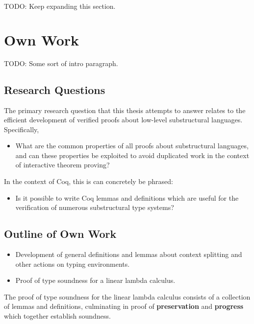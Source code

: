 \documentclass[]{unswthesis}
\begin{document}
TODO: Keep expanding this section.



\chapter{Own Work}

TODO: Some sort of intro paragraph.

\section{Research Questions}

The primary research question that this thesis attempts to answer relates to the efficient development of verified proofs about low-level substructural languages. Specifically,

\begin{itemize}
\item What are the common properties of all proofs about substructural languages, and can these properties be exploited to avoid duplicated work in the context of interactive theorem proving?
\end{itemize}

In the context of Coq, this is can concretely be phrased:

\begin{itemize}
\item Is it possible to write Coq lemmas and definitions which are useful for the verification of numerous substructural type systems?
\end{itemize}



\section{Outline of Own Work}

\begin{itemize}
\item Development of general definitions and lemmas about context splitting and other actions on typing environments.
\item Proof of type soundness for a linear lambda calculus.
\end{itemize}

The proof of type soundness for the linear lambda calculus consists of a collection of lemmas and definitions, culminating in proof of \textbf{preservation} and \textbf{progress} which together establish soundness.
\end{document}

